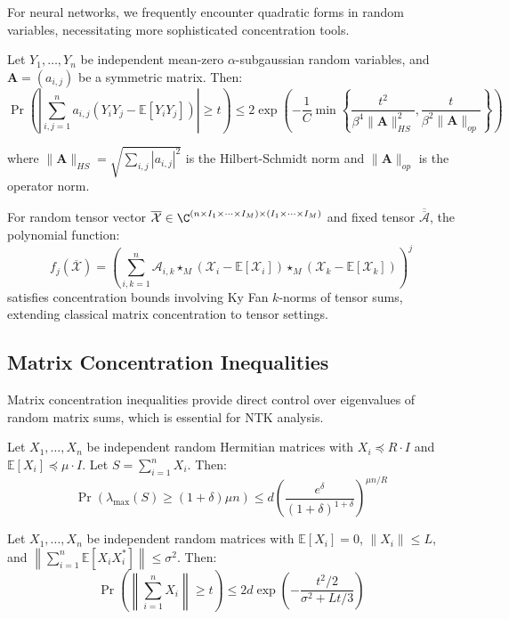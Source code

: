 \documentclass[a4paper]{article}
\newcommand{\E}{\mathbb{E}}
\begin{document}
For neural networks, we frequently encounter quadratic forms in random variables, necessitating more sophisticated concentration tools.

\begin{theorem}
Let $Y_1, \ldots, Y_n$ be independent mean-zero $\alpha$-subgaussian random variables, and $\mathbf{A} = (a_{i,j})$ be a symmetric matrix. Then:
$$\Pr\left(\left|\sum_{i,j=1}^n a_{i,j}(Y_i Y_j - \E[Y_i Y_j])\right| \geq t\right) \leq 2\exp\left(-\frac{1}{C}\min\left\{\frac{t^2}{\beta^4\|\mathbf{A}\|_{HS}^2}, \frac{t}{\beta^2\|\mathbf{A}\|_{op}}\right\}\right)$$
\end{theorem}

where $\|\mathbf{A}\|_{HS} = \sqrt{\sum_{i,j} |a_{i,j}|^2}$ is the Hilbert-Schmidt norm and $\|\mathbf{A}\|_{op}$ is the operator norm.

\begin{theorem}
For random tensor vector $\overline{\mathcal{X}} \in \C^{(n \times I_1 \times \cdots \times I_M) \times (I_1 \times \cdots \times I_M)}$ and fixed tensor $\overline{\overline{\mathcal{A}}}$, the polynomial function:
$$f_j(\overline{\mathcal{X}}) = \left(\sum_{i,k=1}^n \mathcal{A}_{i,k} \star_M (\mathcal{X}_i - \E[\mathcal{X}_i]) \star_M (\mathcal{X}_k - \E[\mathcal{X}_k])\right)^j$$
satisfies concentration bounds involving Ky Fan $k$-norms of tensor sums, extending classical matrix concentration to tensor settings.
\end{theorem}

\subsection{Matrix Concentration Inequalities}

Matrix concentration inequalities provide direct control over eigenvalues of random matrix sums, which is essential for NTK analysis.

\begin{theorem}
Let $X_1, \ldots, X_n$ be independent random Hermitian matrices with $X_i \preceq R \cdot I$ and $\E[X_i] \preceq \mu \cdot I$. Let $S = \sum_{i=1}^n X_i$. Then:
$$\Pr(\lambda_{\max}(S) \geq (1+\delta)\mu n) \leq d \left(\frac{e^\delta}{(1+\delta)^{1+\delta}}\right)^{\mu n / R}$$
\end{theorem}

\begin{theorem}
Let $X_1, \ldots, X_n$ be independent random matrices with $\E[X_i] = 0$, $\|X_i\| \leq L$, and $\left\|\sum_{i=1}^n \E[X_i X_i^*]\right\| \leq \sigma^2$. Then:
$$\Pr\left(\left\|\sum_{i=1}^n X_i\right\| \geq t\right) \leq 2d \exp\left(-\frac{t^2/2}{\sigma^2 + Lt/3}\right)$$
\end{theorem}
\end{document}
